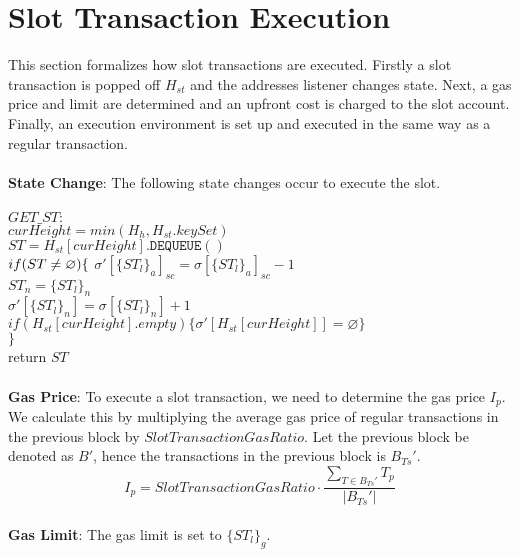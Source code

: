 \documentclass{article}
\begin{document}
\section{Slot Transaction Execution}
This section formalizes how slot transactions are executed. Firstly a slot transaction is popped off $H_{st}$ and the addresses listener changes state. Next, a gas price and limit are determined and an upfront cost is charged to the slot account. Finally, an execution environment is set up and executed in the same way as a regular transaction.
\\\\
\textbf{State Change}: The following state changes occur to execute the slot. 
\\\\
$GET\_ST:$\\
$curHeight = min(H_{h}, H_{st}.keySet)$\\
$ST = H_{st}[curHeight].\texttt{DEQUEUE}()$\\
$if(ST \neq \varnothing)\{\\$
\phantom{x}\hspace{3ex} $\sigma'[\{ST_l\}_a]_{sc} = \sigma[\{ST_l\}_a]_{sc} - 1$\\
\phantom{x}\hspace{3ex} $ST_n = \{ST_l\}_n$\\
\phantom{x}\hspace{3ex} $\sigma'[\{ST_l\}_n] = \sigma[\{ST_l\}_n] + 1$\\
\phantom{x}\hspace{3ex} $if(H_{st}[curHeight].empty)\{\sigma'[H_{st}[curHeight]] = \varnothing\}$\\
$\}$\\
return $ST$
\\\\
\textbf{Gas Price}: To execute a slot transaction, we need to determine the gas price $I_p$. We calculate this by multiplying the average gas price of regular transactions in the previous block by $SlotTransactionGasRatio$. Let the previous block be denoted as $B'$, hence the transactions in the previous block is $B_{Ts}'$.
\begin{equation*}
I_p = SlotTransactionGasRatio \cdot \frac{\sum_{T \in B_{Ts}'} T_p}{|B_{Ts}'|} 
\end{equation*}
\\
\textbf{Gas Limit}: The gas limit is set to $\{ST_l\}_g$.
\end{document}
